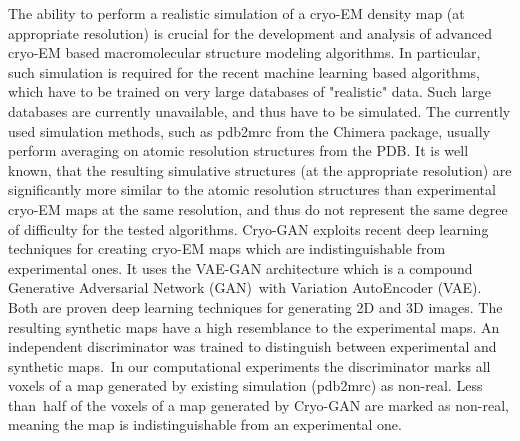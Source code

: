 The ability to perform a realistic simulation of a cryo-EM density map (at appropriate resolution) is crucial for the development and analysis of advanced cryo-EM based macromolecular structure modeling algorithms. In particular, such simulation is required for the recent machine learning based algorithms, which have to be trained on very large databases of "realistic" data.  Such large databases are currently unavailable, and thus have to be simulated.   
The currently used simulation methods, such as pdb2mrc from the Chimera package, usually perform averaging on atomic resolution structures from the PDB.   It is well known, that the resulting simulative structures (at the appropriate resolution) are significantly more similar to the atomic resolution structures than experimental cryo-EM maps at the same resolution, and thus do not represent the same degree of difficulty for the tested algorithms.
Cryo-GAN exploits recent deep learning techniques for creating cryo-EM maps which are indistinguishable from experimental ones. It uses the VAE-GAN architecture which is a compound Generative Adversarial Network (GAN) with Variation AutoEncoder (VAE).  Both are proven deep learning techniques for generating 2D and 3D images.
The resulting synthetic maps have a high resemblance to the experimental maps. An independent discriminator was trained to distinguish between experimental and synthetic maps. In our computational experiments the discriminator marks all voxels of a map generated by existing simulation (pdb2mrc) as non-real. Less than half of the voxels of a map generated by Cryo-GAN are marked as non-real, meaning the map is indistinguishable from an experimental one.